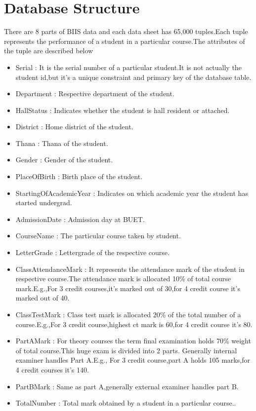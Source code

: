 \section{Database Structure}
There are 8 parts of BIIS data and each data sheet has 65,000 tuples.Each tuple represents the performance of a student in a particular course.The attributes of the tuple are described below
\begin{itemize}
\item Serial : It is the serial number of a particular student.It is not actually the student id,but it's a unique constraint and primary key of the database table.
\item Department : Respective department of the student.
\item HallStatus : Indicates whether the student is hall resident or attached.
\item District : Home district of the student.
\item Thana : Thana of the student.
\item Gender : Gender of the student.
\item PlaceOfBirth : Birth place of the student.
\item StartingOfAcademicYear : Indicates on which academic year the student has started undergrad.
\item AdmissionDate : Admission day at BUET.
\item CourseName : The particular course taken by student.
\item LetterGrade : Lettergrade of the respective course. 
\item ClassAttendanceMark : It represents the attendance mark of the student in respective course.The attendance mark is allocated 10\% of total course mark.E.g.,For 3 credit courses,it's marked out of 30,for 4 credit course it's marked out of 40. 
\item ClassTestMark : Class test mark is allocated 20\% of the total number of a course.E.g.,For 3 credit course,highest ct mark is 60,for 4 credit course it's 80.
\item PartAMark :  For theory courses the term final examination holds 70\% weight of total course.This huge exam is divided into 2 parts. Generally internal examiner handles Part A.E.g., For 3 credit course,part A holds 105 marks,for 4 credit courses it's 140.
\item PartBMark : Same as part A,generally external examiner handles part B.
\item TotalNumber : Total mark obtained by a student in a particular course..

\end{itemize}
